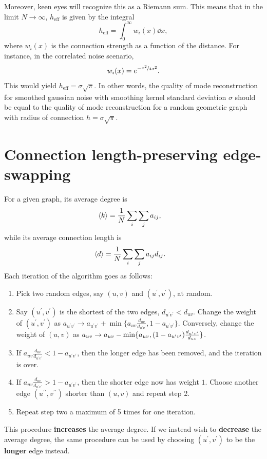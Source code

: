 \documentclass{article}
\begin{document}
\begin{multicols}{2}
Moreover, keen eyes will recognize this as a Riemann sum. This means that in the limit $N\to\infty$, $h_{\text{eff}}$ is given by the integral
\begin{equation*}
    h_{\text{eff}} = \int_0^\infty w_{i} (x) \dd x,
\end{equation*}
where $w_{i} (x)$ is the connection strength as a function of the distance. For instance, in the correlated noise scenario,
\begin{equation*}
    w_{i} (x) = e^{-\nicefrac{x^2}{4\sigma^2}}.
\end{equation*}
This would yield $h_{\text{eff}} = \sigma\sqrt{\pi}$. In other words, the quality of mode reconstruction for smoothed gaussian noise with smoothing kernel standard deviation $\sigma$ should be equal to the quality of mode reconstruction for a random geometric graph with radius of connection $h=\sigma\sqrt{\pi}$.


\section{Connection length-preserving edge-swapping}

For a given graph, its average degree is 
\begin{align*}
    \expval{k} &= \frac{1}{N}\sum_i\sum_j a_{ij},
\end{align*}
while its average connection length is
\begin{align*}
    \expval{d} &= \frac{1}{N}\sum_i\sum_j a_{ij} d_{ij}.
\end{align*}
Each iteration of the algorithm goes as follows:
\begin{enumerate}
    \item Pick two random edges, say $(u, v)$ and $(u^\prime, v^\prime)$, at random.
    \item Say $(u^\prime, v^\prime)$ is the shortest of the two edges, $d_{u^\prime v^\prime} < d_{uv}$. Change the weight of $(u^\prime, v^\prime)$ as $a_{u^\prime v^\prime} \to a_{u^\prime v^\prime} + \min\{a_{uv}\frac{d_{uv}}{d_{u^\prime v^\prime}}, 1 - a_{u^\prime v^\prime}\}$. Conversely, change the weight of $(u, v)$ as $a_{uv} \to a_{uv} - \min\{a_{uv}, \qty(1 - a_{u^\prime v^\prime})\frac{d_{u^\prime v^\prime}}{d_{uv}}\}$.
    \item If $a_{uv}\frac{d_{uv}}{d_{u^\prime v^\prime}} < 1 - a_{u^\prime v^\prime}$, then the longer edge has been removed, and the iteration is over.
    \item If $a_{uv}\frac{d_{uv}}{d_{u^\prime v^\prime}} > 1 - a_{u^\prime v^\prime}$, then the shorter edge now has weight $1$. Choose another edge $(u^{\prime\prime}, v^{\prime\prime})$ shorter than $(u, v)$ and repeat step 2.
    \item Repeat step two a maximum of 5 times for one iteration.
\end{enumerate}
This procedure \textbf{increases} the average degree. If we instead wish to \textbf{decrease} the average degree, the same procedure can be used by choosing $(u^\prime, v^\prime)$ to be the \textbf{longer} edge instead.
\end{multicols}
\end{document}
